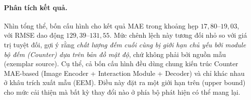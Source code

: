 \documentclass[a4paper,12pt]{report}
\numberwithin{figure}{chapter}
\numberwithin{table}{chapter}
\begin{document}
\paragraph{Phân tích kết quả.}

Nhìn tổng thể, bốn cấu hình cho kết quả MAE trong khoảng hẹp $17{,}80$--$19{,}03$, với RMSE dao động $129{,}39$--$131{,}55$. Mức chênh lệch này tương đối nhỏ so với giá trị tuyệt đối, gợi ý rằng \emph{chất lượng đếm cuối cùng bị giới hạn chủ yếu bởi module bộ đếm (Counter) dựa trên bản đồ mật độ}, chứ không phải bởi nguồn mẫu (exemplar source). Cụ thể, cả bốn cấu hình đều dùng chung kiến trúc Counter MAE-based (Image Encoder + Interaction Module + Decoder) và chỉ khác nhau ở khâu trích xuất mẫu (EEM). Điều này đặt ra một giới hạn trên (upper bound) cho mức cải thiện mà bất kỳ thay đổi nào ở phía bộ phát hiện có thể mang lại.
\end{document}
